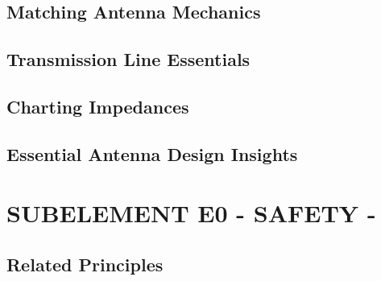 \documentclass[12pt]{book}
\begin{document}
\section{Matching Antenna Mechanics}










\section{Transmission Line Essentials}












\section{Charting Impedances}











\section{Essential Antenna Design Insights}











\chapter{SUBELEMENT E0 - SAFETY -}
\section{Related Principles}












\end{document}
